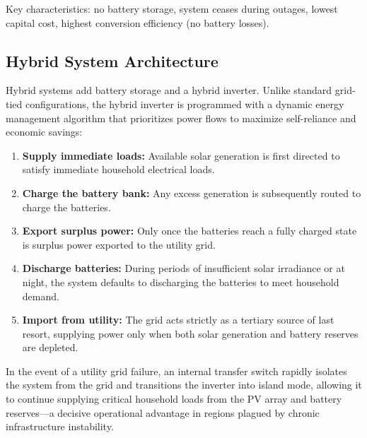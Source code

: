 Key characteristics: no battery storage, system ceases during outages, lowest capital cost, highest conversion efficiency (no battery losses).


\subsection{Hybrid System Architecture}

Hybrid systems add battery storage and a hybrid inverter. Unlike standard grid-tied configurations, the hybrid inverter is programmed with a dynamic energy management algorithm that prioritizes power flows to maximize self-reliance and economic savings:

\begin{enumerate}
    \item \textbf{Supply immediate loads:} Available solar generation is first directed to satisfy immediate household electrical loads.
    \item \textbf{Charge the battery bank:} Any excess generation is subsequently routed to charge the batteries.
    \item \textbf{Export surplus power:} Only once the batteries reach a fully charged state is surplus power exported to the utility grid.
    \item \textbf{Discharge batteries:} During periods of insufficient solar irradiance or at night, the system defaults to discharging the batteries to meet household demand.
    \item \textbf{Import from utility:} The grid acts strictly as a tertiary source of last resort, supplying power only when both solar generation and battery reserves are depleted.
\end{enumerate}

In the event of a utility grid failure, an internal transfer switch rapidly isolates the system from the grid and transitions the inverter into island mode, allowing it to continue supplying critical household loads from the PV array and battery reserves---a decisive operational advantage in regions plagued by chronic infrastructure instability.

